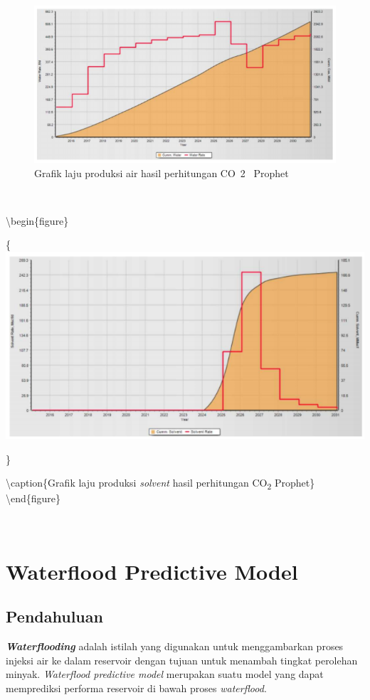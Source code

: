 \documentclass[
]{book}
\begin{document}
~

\begin{figure}

{\centering \includegraphics[width=0.5\linewidth]{images/co2prophet/produksiairprophet} 

}

\caption{Grafik laju produksi air hasil perhitungan CO~2~ Prophet}\label{fig:unnamed-chunk-44}
\end{figure}

~

\textbackslash begin\{figure\}

\{\centering \includegraphics[width=0.5\linewidth]{images/co2prophet/produksisolventprophet}

\}

\textbackslash caption\{Grafik laju produksi \emph{solvent} hasil perhitungan CO\textsubscript{2} Prophet\}\label{fig:unnamed-chunk-45}
\textbackslash end\{figure\}

~

\hypertarget{waterflood-predictive-model}{%
\chapter{Waterflood Predictive Model}\label{waterflood-predictive-model}}

\hypertarget{pendahuluan-1}{%
\section{Pendahuluan}\label{pendahuluan-1}}

\textbf{\emph{Waterflooding}} adalah istilah yang digunakan untuk menggambarkan proses injeksi air ke dalam reservoir dengan tujuan untuk menambah tingkat perolehan minyak. \emph{Waterflood predictive model} merupakan suatu model yang dapat memprediksi performa reservoir di bawah proses \emph{waterflood}.
\end{document}
